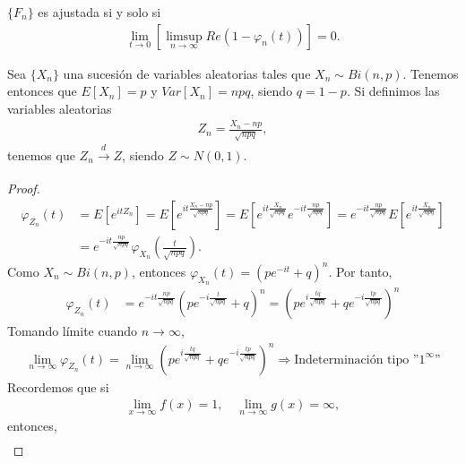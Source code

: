 \begin{teo}
    $\{F_n\}$ es ajustada si y solo si
    \begin{align*}
        \lim_{t \to 0} \left[ \limsup_{n \to \infty} Re(1 - \varphi_n(t)) \right] = 0.
    \end{align*}
\end{teo}

\begin{obs}
    Sea $\{X_n\}$ una sucesión de variables aleatorias tales que $X_n \sim Bi(n,p)$. Tenemos entonces que $E[X_n] = p$ y $Var[X_n] = npq$, siendo $q = 1 - p$. Si definimos las variables aleatorias
    \begin{align*}
        Z_n = \frac{X_n - np}{\sqrt{npq}},
    \end{align*}
    tenemos que $Z_n \xrightarrow[]{d} Z$, siendo $Z \sim N(0,1)$.
    \begin{proof}
        \begin{align*}
            \varphi_{Z_n}(t) & = E \left[ e^{itZ_n} \right] = E \left[ e^{it\frac{X_n - np}{\sqrt{npq}}} \right] = E \left[ e^{it\frac{X_n}{\sqrt{npq}}} e^{-it\frac{np}{\sqrt{npq}}} \right] = e^{-it\frac{np}{\sqrt{npq}}} E \left[ e^{it\frac{X_n}{\sqrt{npq}}} \right] \\
                             & = e^{-it\frac{np}{\sqrt{npq}}} \varphi_{X_n}\left( \frac{t}{\sqrt{npq}} \right) .
        \end{align*}
        Como $X_n \sim Bi(n,p)$, entonces $\varphi_{X_n}(t) = \left( pe^{-it} + q \right)^n$. Por tanto,
        \begin{align*}
            \varphi_{Z_n}(t) & = e^{-it\frac{np}{\sqrt{npq}}} \left( pe^{-i \frac{t}{\sqrt{npq}}} + q \right)^n = \left( pe^{i\frac{tq}{\sqrt{npq}}} + qe^{-i\frac{tp}{\sqrt{npq}}} \right)^n
        \end{align*}
        Tomando límite cuando $n \to \infty$,
        \begin{align*}
            \lim_{n \to \infty} \varphi_{Z_n}(t) = \lim_{n \to \infty} \left( pe^{i\frac{tq}{\sqrt{npq}}} + qe^{-i\frac{tp}{\sqrt{npq}}} \right)^n \Longrightarrow \text{Indeterminación tipo ''$1^{\infty}$''}
        \end{align*}
        Recordemos que si
        \begin{align*}
            \lim_{x \to \infty} f(x) = 1, \quad \lim_{n \to \infty} g(x) = \infty,
        \end{align*}
        entonces,
        \begin{align*}

\end{align*}
\end{proof}
\end{obs}
